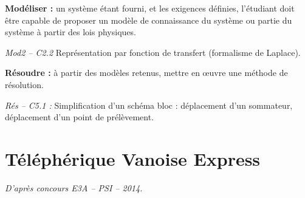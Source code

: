 \documentclass[10pt]{article}
\newif\ifprof
\begin{document}






\begin{comp}
\noindent \textbf{Modéliser :} un système étant fourni, et les exigences définies, l’étudiant doit être capable de proposer un modèle de connaissance du système ou partie du système à partir des lois physiques.

\noindent \textit{Mod2 -- C2.2} Représentation par fonction de transfert (formalisme de Laplace).

\noindent \textbf{Résoudre :} à partir des modèles retenus, mettre en œuvre une méthode de résolution.
 
\noindent \textit{Rés -- C5.1 :} Simplification d’un schéma bloc : déplacement d’un sommateur, déplacement d’un point de prélèvement.
\end{comp}

\section{Téléphérique Vanoise Express}

\begin{flushright}
\textit{D'après concours E3A -- PSI -- 2014.}
\end{flushright}

\ifprof
\else
\end{document}
